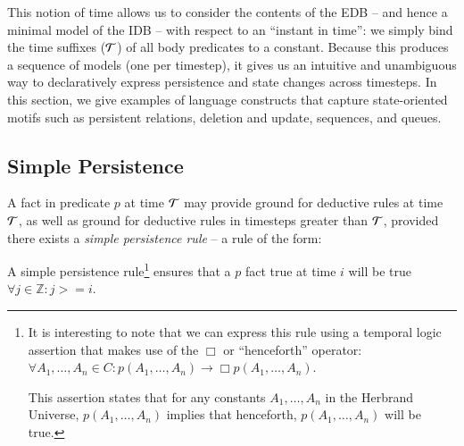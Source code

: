 This notion of time allows us to consider the contents of the EDB -- and hence
a minimal model of the IDB -- with respect to an ``instant in time'': we simply
bind the time suffixes ($\Tau$) of all body predicates to a constant.  Because
this produces a sequence of models (one per timestep), it gives us an intuitive
and unambiguous way to declaratively express persistence and state changes
across timesteps.  In this section, we give examples of language constructs
that capture state-oriented motifs such as persistent relations,
deletion and update, sequences, and queues.

\subsection{Simple Persistence}

A fact in predicate $p$ at time $\Tau$ may provide ground for deductive rules
at time $\Tau$, as well as ground for deductive rules in timesteps greater than $\Tau$,
provided there exists a {\em simple persistence rule} -- a rule of the form:



A simple persistence rule\footnote{It is interesting to note that we can
express this rule using a temporal logic assertion that makes use of the $\Box$
or ``henceforth'' operator:
$\forall A_1, \ldots, A_n \in C : p$\pos$(A_1, \ldots, A_n) \to \Box p$\pos$(A_1,
\ldots, A_n)$.

This assertion states that for any constants $A_1, \ldots, A_n$ in the Herbrand
Universe, $p$\pos$(A_1, \ldots, A_n)$ implies that henceforth, \linebreak
$p$\pos$(A_1, \ldots, A_n)$ will be true.}
%
 ensures that a $p$ fact true at time $i$ will be true $\forall j \in \mathbb{Z} : j >= i$.


